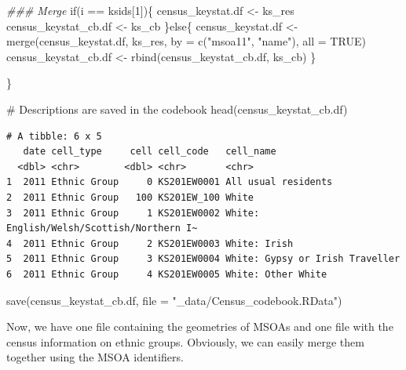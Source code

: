 \documentclass[
  letterpaper,
  DIV=11,
  numbers=noendperiod]{scrreprt}
\newenvironment{Shaded}{\begin{snugshade}}{\end{snugshade}}
\newcommand{\AttributeTok}[1]{\textcolor[rgb]{0.40,0.45,0.13}{#1}}
\newcommand{\CommentTok}[1]{\textcolor[rgb]{0.37,0.37,0.37}{#1}}
\newcommand{\ConstantTok}[1]{\textcolor[rgb]{0.56,0.35,0.01}{#1}}
\newcommand{\ControlFlowTok}[1]{\textcolor[rgb]{0.00,0.23,0.31}{#1}}
\newcommand{\DecValTok}[1]{\textcolor[rgb]{0.68,0.00,0.00}{#1}}
\newcommand{\DocumentationTok}[1]{\textcolor[rgb]{0.37,0.37,0.37}{\textit{#1}}}
\newcommand{\FunctionTok}[1]{\textcolor[rgb]{0.28,0.35,0.67}{#1}}
\newcommand{\NormalTok}[1]{\textcolor[rgb]{0.00,0.23,0.31}{#1}}
\newcommand{\OtherTok}[1]{\textcolor[rgb]{0.00,0.23,0.31}{#1}}
\newcommand{\SpecialCharTok}[1]{\textcolor[rgb]{0.37,0.37,0.37}{#1}}
\newcommand{\StringTok}[1]{\textcolor[rgb]{0.13,0.47,0.30}{#1}}
\begin{document}
\begin{Shaded}
\begin{Highlighting}[]
  \DocumentationTok{\#\#\# Merge}
  \ControlFlowTok{if}\NormalTok{(i }\SpecialCharTok{==}\NormalTok{ ksids[}\DecValTok{1}\NormalTok{])\{}
\NormalTok{    census\_keystat.df }\OtherTok{\textless{}{-}}\NormalTok{ ks\_res}
\NormalTok{    census\_keystat\_cb.df }\OtherTok{\textless{}{-}}\NormalTok{ ks\_cb}
\NormalTok{  \}}\ControlFlowTok{else}\NormalTok{\{}
\NormalTok{    census\_keystat.df }\OtherTok{\textless{}{-}} \FunctionTok{merge}\NormalTok{(census\_keystat.df, ks\_res, }\AttributeTok{by =} \FunctionTok{c}\NormalTok{(}\StringTok{"msoa11"}\NormalTok{, }\StringTok{"name"}\NormalTok{), }\AttributeTok{all =} \ConstantTok{TRUE}\NormalTok{)}
\NormalTok{    census\_keystat\_cb.df }\OtherTok{\textless{}{-}} \FunctionTok{rbind}\NormalTok{(census\_keystat\_cb.df, ks\_cb)}
\NormalTok{  \}}

\NormalTok{\}}


\CommentTok{\# Descriptions are saved in the codebook}
\FunctionTok{head}\NormalTok{(census\_keystat\_cb.df)}
\end{Highlighting}
\end{Shaded}

\begin{verbatim}
# A tibble: 6 x 5
   date cell_type     cell cell_code   cell_name                                
  <dbl> <chr>        <dbl> <chr>       <chr>                                    
1  2011 Ethnic Group     0 KS201EW0001 All usual residents                      
2  2011 Ethnic Group   100 KS201EW_100 White                                    
3  2011 Ethnic Group     1 KS201EW0002 White: English/Welsh/Scottish/Northern I~
4  2011 Ethnic Group     2 KS201EW0003 White: Irish                             
5  2011 Ethnic Group     3 KS201EW0004 White: Gypsy or Irish Traveller          
6  2011 Ethnic Group     4 KS201EW0005 White: Other White                       
\end{verbatim}

\begin{Shaded}
\begin{Highlighting}[]
\FunctionTok{save}\NormalTok{(census\_keystat\_cb.df, }\AttributeTok{file =} \StringTok{"\_data/Census\_codebook.RData"}\NormalTok{)}
\end{Highlighting}
\end{Shaded}

Now, we have one file containing the geometries of MSOAs and one file
with the census information on ethnic groups. Obviously, we can easily
merge them together using the MSOA identifiers.
\end{document}
